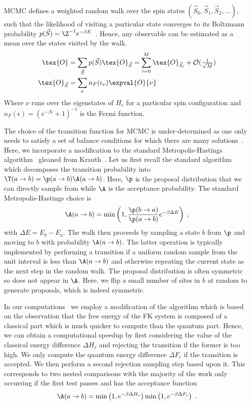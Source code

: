 \ac{MCMC} defines a weighted random walk over the spin states \((\vec{S}_0, \vec{S}_1, \vec{S}_2, ...)\), such that the likelihood of visiting a particular state converges to its Boltzmann probability \(p(\vec{S}) = \Z^{-1} e^{-\beta E}\)~\cite{binderGuidePracticalWork1988,kerteszAdvancesComputerSimulation1998,wolffMonteCarloErrors2004}. Hence, any observable can be estimated as a mean over the states visited by the walk.
\begin{align} \label{eq:thermal_expectation}
\tex{O}& = \sum_{\vec{S}} p(\vec{S}) \tex{O}_{\vec{S}} = \sum_{i = 0}^{M} \tex{O}_{\vec{S}_i} + \mathcal{O}(\tfrac{1}{\sqrt{M}})\\
\tex{O}_{\vec{S}}& = \sum_{\nu} n_F(\epsilon_{\nu}) \expval{O}{\nu}
\end{align}
Where \(\nu\) runs over the eigenstates of \(H_c\) for a particular spin configuration and \(n_F(\epsilon) = \left(e^{-\beta\epsilon} + 1\right)^{-1}\) is the Fermi function.

The choice of the transition function for \ac{MCMC} is under-determined as one only needs to satisfy a set of balance conditions for which there are many solutions~\cite{kellyReversibilityStochasticNetworks1981}. Here, we incorporate a modification to the standard Metropolis-Hastings algorithm~\cite{hastingsMonteCarloSampling1970} gleaned from Krauth~\cite{krauthIntroductionMonteCarlo1998}. Let us first recall the standard algorithm which decomposes the transition probability into \(\T(a \to b) = \p(a \to b)\A(a \to b)\). Here,  \(\p\) is the proposal distribution that we can directly sample from while \(\A\) is the acceptance probability. The standard Metropolis-Hastings choice is 
\[\A(a \to b) = \min\left(1, \frac{\p(b\to a)}{\p(a\to b)} e^{-\beta \Delta E}\right)\;,\]
with \(\Delta E = E_b - E_a\). The walk then proceeds by sampling a state \(b\) from \(\p\) and moving to \(b\) with probability \(\A(a \to b)\). The latter operation is typically implemented by performing a transition if a uniform random sample from the unit interval is less than \(\A(a \to b)\) and otherwise repeating the current state as the next step in the random walk. The proposal distribution is often symmetric so does not appear in \(\A\). Here, we flip a small number of sites in \(b\) at random to generate proposals, which is indeed symmetric. 

In our computations~\cite{hodsonMCMCFKModel2021} we employ a modification of the algorithm which is based on the observation that the free energy of the \ac{FK} system is composed of a classical part which is much quicker to compute than the quantum part. Hence, we can obtain a computational speedup by first considering the value of the classical energy difference \(\Delta H_s\) and rejecting the transition if the former is too high. We only compute the quantum energy difference \(\Delta F_c\) if the transition is accepted. We then 
perform a second rejection sampling step based upon it. This corresponds to two nested comparisons with the majority of the work only occurring if the first test passes and has the acceptance function 
\[\A(a \to b) = \min\left(1, e^{-\beta \Delta H_s}\right)\min\left(1, e^{-\beta \Delta F_c}\right)\;.\]

